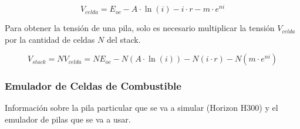 \begin{equation}\label{v_celda}
    \boxed{V_{celda} = E_{oc} - A\cdot\ln(i) - i\cdot r - m\cdot e^{ni}}
\end{equation}

Para obtener la tensión de una pila, solo es necesario multiplicar la tensión $V_{celda}$ por la cantidad de celdas $N$ del stack.

\begin{equation}\label{v_stack}
    V_{stack} = NV_{celda} = NE_{oc} - N(A\cdot\ln(i)) - N(i\cdot r) - N(m\cdot e^{ni})
\end{equation}

\subsubsection{Emulador de Celdas de Combustible}

Información sobre la pila particular que se va a simular (Horizon H300) y el emulador de pilas que se va a usar.\\
